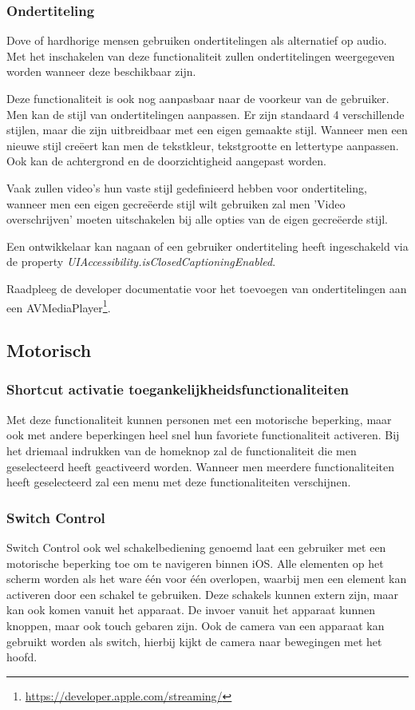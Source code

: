 \subsubsection{Ondertiteling}
\label{subsec:ondertiteliOS}
Dove of hardhorige mensen gebruiken ondertitelingen als alternatief op audio. Met het inschakelen van deze functionaliteit zullen ondertitelingen weergegeven worden wanneer deze beschikbaar zijn.

Deze functionaliteit is ook nog aanpasbaar naar de voorkeur van de gebruiker. Men kan de stijl van ondertitelingen aanpassen. Er zijn standaard 4 verschillende stijlen, maar die zijn uitbreidbaar met een eigen gemaakte stijl. Wanneer men een nieuwe stijl creëert kan men de tekstkleur, tekstgrootte en lettertype aanpassen. Ook kan de achtergrond en de doorzichtigheid aangepast worden. 

Vaak zullen video's hun vaste stijl gedefinieerd hebben voor ondertiteling, wanneer men een eigen gecreëerde stijl wilt gebruiken zal men  'Video overschrijven' moeten uitschakelen bij alle opties van de eigen gecreëerde stijl.

Een ontwikkelaar kan nagaan of een gebruiker ondertiteling heeft ingeschakeld via de property \emph{UIAccessibility.isClosedCaptioningEnabled}.

Raadpleeg de developer documentatie voor het toevoegen van ondertitelingen aan een AVMediaPlayer\footnote{\url{https://developer.apple.com/streaming/}}.
\subsection{Motorisch}
\subsubsection{Shortcut activatie toegankelijkheidsfunctionaliteiten}
Met deze functionaliteit kunnen personen met een motorische beperking, maar ook met andere beperkingen heel snel hun favoriete functionaliteit activeren. Bij het driemaal indrukken van de homeknop zal de functionaliteit die men geselecteerd heeft geactiveerd worden. Wanneer men meerdere functionaliteiten heeft geselecteerd zal een menu met deze functionaliteiten verschijnen.
\subsubsection{Switch Control}
\label{subsec:schakeliOS}
Switch Control ook wel schakelbediening genoemd laat een gebruiker met een motorische beperking toe om te navigeren binnen iOS. Alle elementen op het scherm worden als het ware één voor één overlopen, waarbij men een element kan activeren door een schakel te gebruiken. Deze schakels kunnen extern zijn, maar kan ook komen vanuit het apparaat. De invoer vanuit het apparaat kunnen knoppen, maar ook touch gebaren zijn. Ook de camera van een apparaat kan gebruikt worden als switch, hierbij kijkt de camera naar bewegingen met het hoofd.


